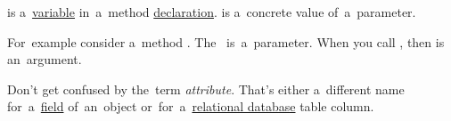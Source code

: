 \label{parameterargument}
\begin{itemize}
     is a~\hyperref[variablefieldproperty]{variable} in~a~method \hyperref[declarationdefinition]{declaration}.
     is a~concrete value of~a~parameter.
\end{itemize}
For~example consider a~method .
The~ is~a~parameter.
When you call , then  is an~argument.

\warning Don't get confused by the~term \textit{attribute}.
That's either a~different name for~a~\hyperref[variablefieldproperty]{field} of~an~object or~for~a~\hyperref[relationaldatabase]{relational database} table column.
